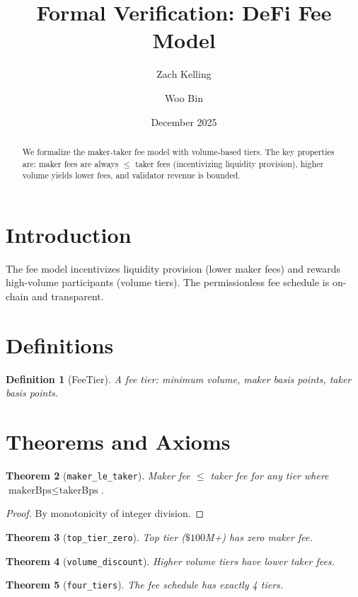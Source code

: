 \documentclass[11pt]{article}
\title{Formal Verification: DeFi Fee Model}
\author{Zach Kelling \and Woo Bin}
\date{December 2025}
\newtheorem{theorem}{Theorem}
\newtheorem{definition}[theorem]{Definition}
\begin{document}
\maketitle

\begin{abstract}
We formalize the maker-taker fee model with volume-based tiers. The key properties are: maker fees are always $\leq$ taker fees (incentivizing liquidity provision), higher volume yields lower fees, and validator revenue is bounded.
\end{abstract}

\section{Introduction}
The fee model incentivizes liquidity provision (lower maker fees) and rewards high-volume participants (volume tiers). The permissionless fee schedule is on-chain and transparent.

\section{Definitions}
\begin{definition}[FeeTier]
A fee tier: minimum volume, maker basis points, taker basis points.
\end{definition}


\section{Theorems and Axioms}
\begin{theorem}[\texttt{maker\_le\_taker}]
Maker fee $\leq$ taker fee for any tier where $\text{makerBps} \leq \text{takerBps}$.
\end{theorem}
\begin{proof}
By monotonicity of integer division.
\end{proof}

\begin{theorem}[\texttt{top\_tier\_zero}]
Top tier ($\$100$M+) has zero maker fee.
\end{theorem}

\begin{theorem}[\texttt{volume\_discount}]
Higher volume tiers have lower taker fees.
\end{theorem}

\begin{theorem}[\texttt{four\_tiers}]
The fee schedule has exactly 4 tiers.
\end{theorem}
\end{document}
